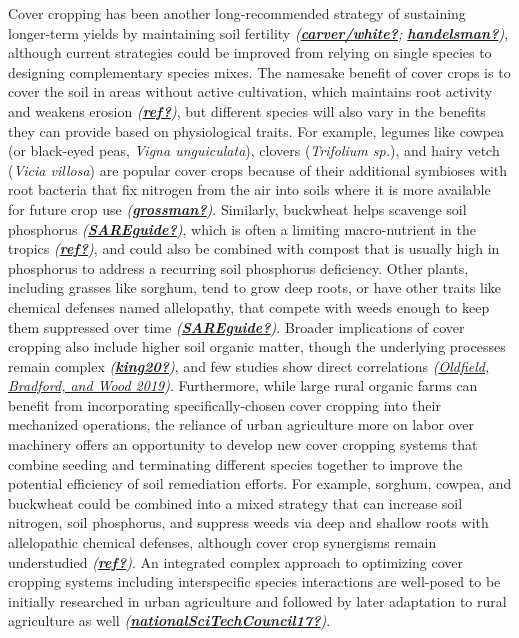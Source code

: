 \documentclass[
]{article}
\begin{document}
Cover cropping has been another long-recommended strategy of sustaining longer-term yields by maintaining soil fertility \emph{(\protect\hyperlink{ref-carverux2fwhite}{\textbf{carver/white?}}; \protect\hyperlink{ref-handelsman}{\textbf{handelsman?}})}, although current strategies could be improved from relying on single species to designing complementary species mixes.
The namesake benefit of cover crops is to cover the soil in areas without active cultivation, which maintains root activity and weakens erosion \emph{(\protect\hyperlink{ref-ref}{\textbf{ref?}})}, but different species will also vary in the benefits they can provide based on physiological traits.
For example, legumes like cowpea (or black-eyed peas, \emph{Vigna unguiculata}), clovers (\emph{Trifolium sp.}), and hairy vetch (\emph{Vicia villosa}) are popular cover crops because of their additional symbioses with root bacteria that fix nitrogen from the air into soils where it is more available for future crop use \emph{(\protect\hyperlink{ref-grossman}{\textbf{grossman?}})}.
Similarly, buckwheat helps scavenge soil phosphorus \emph{(\protect\hyperlink{ref-SAREguide}{\textbf{SAREguide?}})}, which is often a limiting macro-nutrient in the tropics \emph{(\protect\hyperlink{ref-ref}{\textbf{ref?}})}, and could also be combined with compost that is usually high in phosphorus to address a recurring soil phosphorus deficiency.
Other plants, including grasses like sorghum, tend to grow deep roots, or have other traits like chemical defenses named allelopathy, that compete with weeds enough to keep them suppressed over time \emph{(\protect\hyperlink{ref-SAREguide}{\textbf{SAREguide?}})}.
Broader implications of cover cropping also include higher soil organic matter, though the underlying processes remain complex \emph{(\protect\hyperlink{ref-king20}{\textbf{king20?}})}, and few studies show direct correlations \emph{(\protect\hyperlink{ref-oldfield19}{Oldfield, Bradford, and Wood 2019})}.
Furthermore, while large rural organic farms can benefit from incorporating specifically-chosen cover cropping into their mechanized operations, the reliance of urban agriculture more on labor over machinery offers an opportunity to develop new cover cropping systems that combine seeding and terminating different species together to improve the potential efficiency of soil remediation efforts.
For example, sorghum, cowpea, and buckwheat could be combined into a mixed strategy that can increase soil nitrogen, soil phosphorus, and suppress weeds via deep and shallow roots with allelopathic chemical defenses, although cover crop synergisms remain understudied \emph{(\protect\hyperlink{ref-ref}{\textbf{ref?}})}.
An integrated complex approach to optimizing cover cropping systems including interspecific species interactions are well-posed to be initially researched in urban agriculture and followed by later adaptation to rural agriculture as well \emph{(\protect\hyperlink{ref-nationalSciTechCouncil17}{\textbf{nationalSciTechCouncil17?}})}.
\end{document}
